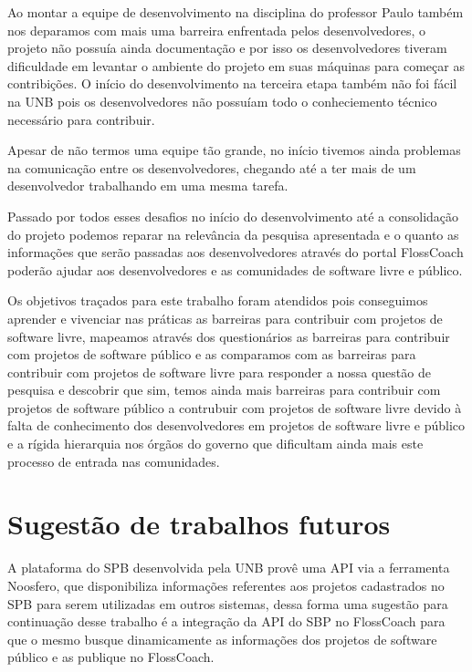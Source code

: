 Ao montar a equipe de desenvolvimento na disciplina do professor Paulo também nos deparamos
com mais uma barreira enfrentada pelos desenvolvedores, o projeto não possuía ainda 
documentação e por isso os desenvolvedores tiveram dificuldade em levantar o ambiente 
do projeto em suas máquinas para começar as contribições. O início do desenvolvimento
na terceira etapa também não foi fácil na UNB pois os desenvolvedores não possuíam
todo o conheciemento técnico necessário para contribuir.

Apesar de não termos uma equipe tão grande, no início tivemos ainda problemas na
comunicação entre os desenvolvedores, chegando até a ter mais de um desenvolvedor 
trabalhando em uma mesma tarefa.

Passado por todos esses desafios no início do desenvolvimento até a consolidação
do projeto podemos reparar na relevância da pesquisa apresentada e o quanto as
informações que serão passadas aos desenvolvedores através do portal FlossCoach poderão
ajudar aos desenvolvedores e as comunidades de software livre e público.

Os objetivos traçados para este trabalho foram atendidos pois conseguimos aprender
e vivenciar nas práticas as barreiras para contribuir com projetos de software livre,
mapeamos através dos questionários as barreiras para contribuir com projetos de 
software público  e as comparamos com as barreiras para contribuir com projetos
de software livre para responder a nossa questão de pesquisa e descobrir que sim,
temos ainda mais barreiras para contribuir com projetos de software público a contrubuir
com projetos de software livre devido à falta de conhecimento dos desenvolvedores
em projetos de software livre e público e a rígida hierarquia nos órgãos do governo
que dificultam ainda mais este processo de entrada nas comunidades.

\section{Sugestão de trabalhos futuros}

A plataforma do SPB desenvolvida pela UNB provê uma API via a ferramenta Noosfero,
que disponibiliza informações referentes aos projetos cadastrados no SPB para
serem utilizadas em outros sistemas, dessa forma uma sugestão para continuação
desse trabalho é a integração da API do SBP no FlossCoach para que o mesmo 
busque dinamicamente as informações dos projetos de software público e as
publique no FlossCoach.


